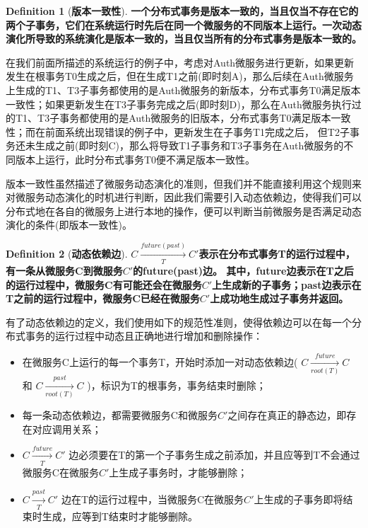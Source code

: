 \documentclass[12pt,a4paper]{article}
\theoremstyle{definition}
\newtheorem{definition}{Definition}[section]
\begin{document}
\begin{definition}[\textbf{版本一致性}]
\label{definition:version_consistency}
\textbf{一个分布式事务是版本一致的，当且仅当不存在它的两个子事务，它们在系统运行时先后在同一个微服务的不同版本上运行。一次动态演化所导致的系统演化是版本一致的，当且仅当所有的分布式事务是版本一致的。}
\end{definition}



在我们前面所描述的系统运行的例子中，考虑对Auth微服务进行更新，如果更新发生在根事务T0生成之后，但在生成T1之前(即时刻A)，那么后续在Auth微服务上生成的T1、T3子事务都使用的是Auth微服务的新版本，分布式事务T0满足版本一致性；如果更新发生在T3子事务完成之后(即时刻D)，那么在Auth微服务执行过的T1、T3子事务都使用的是Auth微服务的旧版本，分布式事务T0满足版本一致性；而在前面系统出现错误的例子中，更新发生在子事务T1完成之后， 但T2子事务还未生成之前(即时刻C)，那么将导致T1子事务和T3子事务在Auth微服务的不同版本上运行，此时分布式事务T0便不满足版本一致性。

版本一致性虽然描述了微服务动态演化的准则，但我们并不能直接利用这个规则来对微服务动态演化的时机进行判断，因此我们需要引入动态依赖边，使得我们可以分布式地在各自的微服务上进行本地的操作，便可以判断当前微服务是否满足动态演化的条件(即版本一致性)。

\begin{definition}[\textbf{动态依赖边}]
\label{definition:dynamic_dependences}
\textbf{$C \xrightarrow[T]{future(past)}  C'$表示在分布式事务T的运行过程中，有一条从微服务C到微服务$C'$的future(past)边。
其中，future边表示在T之后的运行过程中，微服务C有可能还会在微服务$C'$上生成新的子事务；past边表示在T之前的运行过程中，微服务C已经在微服务$C'$上成功地生成过子事务并返回。}
\end{definition}



有了动态依赖边的定义，我们使用如下的规范性准则，使得依赖边可以在每一个分布式事务的运行过程中动态且正确地进行增加和删除操作：

\begin{itemize}
\item{在微服务C上运行的每一个事务T，开始时添加一对动态依赖边( $C \xrightarrow[root(T)]{future}C$ 和 $C \xrightarrow[root(T)]{past}C$ )，标识为T的根事务，事务结束时删除；}


\item{每一条动态依赖边，都需要微服务C和微服务$C'$之间存在真正的静态边，即存在对应调用关系；}


\item{$C \xrightarrow[T]{future}C'$ 边必须要在T的第一个子事务生成之前添加，并且应等到T不会通过微服务C在微服务$C'$上生成子事务时，才能够删除；}


\item{$C \xrightarrow[T]{past}C'$ 边在T的运行过程中，当微服务C在微服务$C'$上生成的子事务即将结束时生成，应等到T结束时才能够删除。}
\end{itemize}
\end{document}
